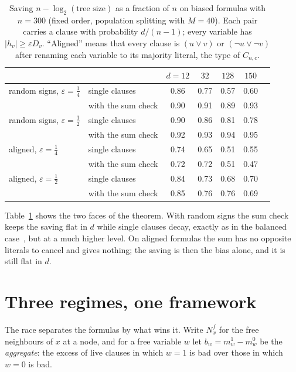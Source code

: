 \documentclass[11pt,a4paper]{article}
\theoremstyle{definition}
\theoremstyle{remark}
\begin{document}
\begin{table}[ht]
\centering
\begin{tabular}{llccccc}
\toprule
 & & $d=12$ & $32$ & $128$ & $150$\\
\midrule
random signs, $\varepsilon=\frac14$ & single clauses & 0.86 & 0.77 & 0.57 & 0.60\\
 & with the sum check & 0.90 & 0.91 & 0.89 & 0.93\\
random signs, $\varepsilon=\frac12$ & single clauses & 0.90 & 0.86 & 0.81 & 0.78\\
 & with the sum check & 0.92 & 0.93 & 0.94 & 0.95\\
aligned, $\varepsilon=\frac14$ & single clauses & 0.74 & 0.65 & 0.51 & 0.55\\
 & with the sum check & 0.72 & 0.72 & 0.51 & 0.47\\
aligned, $\varepsilon=\frac12$ & single clauses & 0.84 & 0.73 & 0.68 & 0.70\\
 & with the sum check & 0.85 & 0.76 & 0.76 & 0.69\\
\bottomrule
\end{tabular}
\caption{Saving $n-\log_2(\text{tree size})$ as a fraction of $n$ on biased
formulas with $n=300$ (fixed order, population splitting with $M=40$). Each
pair carries a clause with probability $d/(n-1)$; every variable has
$|h_v|\ge\varepsilon D_v$. ``Aligned'' means that every clause is $(u\lor v)$
or $(\neg u\lor\neg v)$ after renaming each variable to its majority literal,
the type of $C_{n,c}$.}\label{tab:biased}
\end{table}

Table~\ref{tab:biased} shows the two faces of the theorem. With random signs
the sum check keeps the saving flat in $d$ while single clauses decay, exactly
as in the balanced case~\cite[Table~2]{N7}, but at a much higher level. On
aligned formulas the sum has no opposite literals to cancel and gives nothing;
the saving is then the bias alone, and it is still flat in $d$.

\section{Three regimes, one framework}\label{sec:regimes}

The race separates the formulas by what wins it. Write $N^f_x$ for the free
neighbours of $x$ at a node, and for a free variable $w$ let
$b_w=m^1_w-m^0_w$ be the \emph{aggregate}: the excess of live clauses in
which $w=1$ is bad over those in which $w=0$ is bad.
\end{document}
